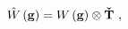 \begin{equation}
\hat{W}\left( \mathbf{g}\right) =W\left( \mathbf{g}\right) \otimes \mathbf{%
\check{T}~,}
\end{equation}

